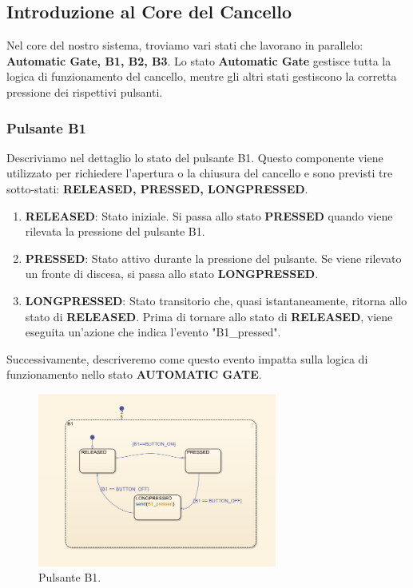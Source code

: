\documentclass[12pt]{article}
\begin{document}
\subsection{Introduzione al Core del Cancello}

Nel core del nostro sistema, troviamo vari stati che lavorano in parallelo: \textbf{Automatic Gate, B1, B2, B3}. Lo stato \textbf{Automatic Gate} gestisce tutta la logica di funzionamento del cancello, mentre gli altri stati gestiscono la corretta pressione dei rispettivi pulsanti.

\subsubsection{Pulsante B1}

Descriviamo nel dettaglio lo stato del pulsante B1. Questo componente viene utilizzato per richiedere l'apertura o la chiusura del cancello e sono previsti tre sotto-stati: \textbf{RELEASED, PRESSED, LONGPRESSED}.

\begin{enumerate}
    \item \textbf{RELEASED}: Stato iniziale. Si passa allo stato \textbf{PRESSED} quando viene rilevata la pressione del pulsante B1.
    \item \textbf{PRESSED}: Stato attivo durante la pressione del pulsante. Se viene rilevato un fronte di discesa, si passa allo stato \textbf{LONGPRESSED}.
    \item \textbf{LONGPRESSED}: Stato transitorio che, quasi istantaneamente, ritorna allo stato di \textbf{RELEASED}. Prima di tornare allo stato di \textbf{RELEASED}, viene eseguita un'azione che indica l'evento "B1\_pressed".
\end{enumerate}

\noindent Successivamente, descriveremo come questo evento impatta sulla logica di funzionamento nello stato \textbf{AUTOMATIC GATE}.

\begin{figure}[h]
    \centering
    \includegraphics[width=0.7\textwidth]{imm/Pulsante_B1.png}
    \caption{Pulsante B1.}
\end{figure}
\newpage
\end{document}
